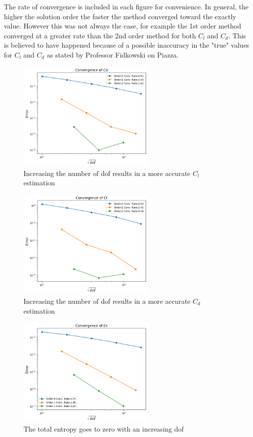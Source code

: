 \documentclass{article}
\begin{document}
The rate of convergence is included in each figure for convenience.
In general, the higher the solution order the faster the method converged toward the exactly value.
However this was not always the case, for example the 1st order method converged at a greater rate than the 2nd order method for both $C_l$ and $C_d$.
This is believed to have happened because of a possible inaccuracy in the "true" values for $C_l$ and $C_d$ as stated by Professor Fidkowski on Piazza.

\begin{figure}[H]
		\centering
		\includegraphics[width=0.60\textwidth,keepaspectratio]{conv_cd.png}
		\caption{Increasing the number of dof results in a more accurate $C_l$ estimation}
	\label{fig:conv_cl}
\end{figure}
\begin{figure}[H]
	\centering
	\includegraphics[width=0.60\textwidth,keepaspectratio]{conv_cl.png}
	\caption{Increasing the number of dof results in a more accurate $C_d$ estimation}
	\label{fig:conv_cd}
\end{figure}
\begin{figure}[H]
	\centering
	\includegraphics[width=0.60\textwidth,keepaspectratio]{conv_Es.png}
	\caption{The total entropy goes to zero with an increasing dof}
	\label{fig:conv_Es}
\end{figure}
\end{document}
